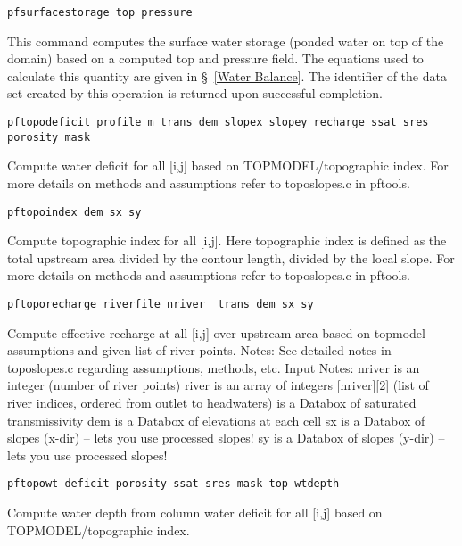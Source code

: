 \begin{description}
\item{\begin{verbatim}pfsurfacestorage top pressure\end{verbatim}}
This command computes the surface water storage (ponded water on top of the domain) based on a computed
top and pressure field. The equations used to calculate this quantity are given in \S~\ref{Water Balance}. The identifier
of the data set created by this operation is returned upon successful
completion.


\item{\begin{verbatim}pftopodeficit profile m trans dem slopex slopey recharge ssat sres porosity mask\end{verbatim}}
Compute water deficit for all [i,j] based on TOPMODEL/topographic index. For more details on methods and assumptions
refer to toposlopes.c in pftools.

\item{\begin{verbatim}pftopoindex dem sx sy\end{verbatim}}
Compute topographic index for all [i,j].  Here topographic index is defined as the total upstream area divided by the contour
length, divided by the local slope. For more details on methods and assumptions refer to toposlopes.c in pftools.


\item{\begin{verbatim}pftoporecharge riverfile nriver  trans dem sx sy\end{verbatim}}
Compute effective recharge at all [i,j] over upstream area based on topmodel assumptions and given list of river points.
Notes:  See detailed notes in toposlopes.c regarding assumptions, methods, etc. Input Notes: nriver is an integer (number
of river points) river  is an array of integers [nriver][2] (list of river indices, ordered from outlet to headwaters) is
a Databox of saturated transmissivity dem    is a Databox of elevations at each cell sx is a Databox of slopes (x-dir) --
lets you use processed slopes! sy is a Databox of slopes (y-dir) -- lets you use processed slopes!

\item{\begin{verbatim}pftopowt deficit porosity ssat sres mask top wtdepth\end{verbatim}}
Compute water depth from column water deficit for all [i,j] based on TOPMODEL/topographic index.


\end{description}
